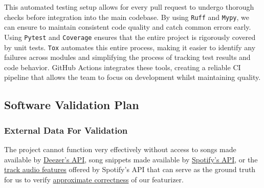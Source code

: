 \documentclass[12pt, titlepage]{article}
\begin{document}
\noindent
This automated testing setup allows for every pull request to undergo thorough checks before integration
into the main codebase. By using \texttt{Ruff} and \texttt{Mypy}, we can ensure to maintain consistent
code quality and catch common errors early. Using \texttt{Pytest} and \texttt{Coverage} ensures that the 
entire project is rigorously covered by unit tests. \texttt{Tox} automates this entire process, making it easier
 to identify any failures across modules and simplifying the process of tracking test results and code behavior. 
 GitHub Actions integrates these tools, creating a reliable CI pipeline that allows the team to focus on development
whilst maintaining quality.

\subsection{Software Validation Plan}






\subsubsection{External Data For Validation}
The project cannot function very effectively without access to songs made available by \href{https://developers.deezer.com/api}{Deezer's API}, song snippets made available by \href{https://developer.spotify.com/documentation/web-api}{Spotify's API}, or the \href{https://developer.spotify.com/documentation/web-api/reference/get-several-audio-features}{track audio features} offered by Spotify's API that can serve as the ground truth for us to verify \href{https://en.wikipedia.org/wiki/Probably_approximately_correct_learning#:~:text=In%20this%20framework,the%20samples.}{approximate correctness} of our featurizer.
\end{document}
